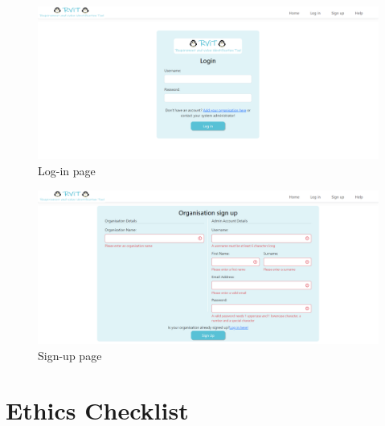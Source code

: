 \documentclass{l4proj}
\begin{document}
\begin{appendices}
\begin{figure}[h!]
\centering
\includegraphics[scale=0.4]{dissertation/images/login.png}
\caption{Log-in page}
\label{fig: login}
\end{figure}
\hfill
\begin{figure}[h!]
\centering
\includegraphics[scale=0.4]{dissertation/images/sign up.png}
\caption{Sign-up page}
\label{fig:sign up}
\end{figure}

\chapter{Ethics Checklist}
\label{app: ethics checklist}


\end{appendices}
\end{document}
